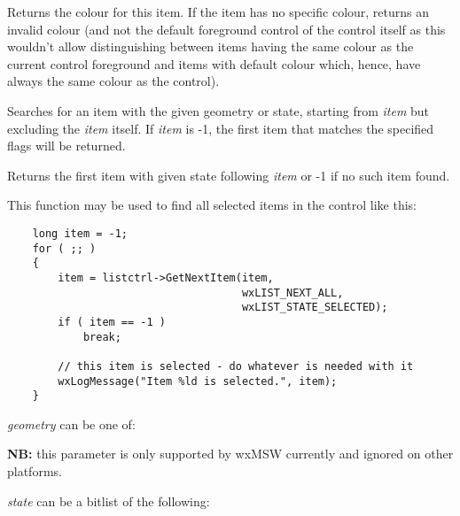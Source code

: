 Returns the colour for this item. If the item has no specific colour, returns
an invalid colour (and not the default foreground control of the control itself
as this wouldn't allow distinguishing between items having the same colour as
the current control foreground and items with default colour which, hence, have
always the same colour as the control).


\label{wxlistctrlgetnextitem}


Searches for an item with the given geometry or state, starting from
{\it item} but excluding the {\it item} itself. If {\it item} is -1,
the first item that matches the specified flags will be returned.

Returns the first item with given state following {\it item} or -1 if
no such item found.

This function may be used to find all selected items in the control like this:

\begin{verbatim}
    long item = -1;
    for ( ;; )
    {
        item = listctrl->GetNextItem(item,
                                     wxLIST_NEXT_ALL,
                                     wxLIST_STATE_SELECTED);
        if ( item == -1 )
            break;

        // this item is selected - do whatever is needed with it
        wxLogMessage("Item %ld is selected.", item);
    }
\end{verbatim}

{\it geometry} can be one of:

\twocolwidtha{5cm}
\begin{twocollist}\itemsep=0pt
\end{twocollist}

{\bf NB:} this parameter is only supported by wxMSW currently and ignored on
other platforms.

{\it state} can be a bitlist of the following:

